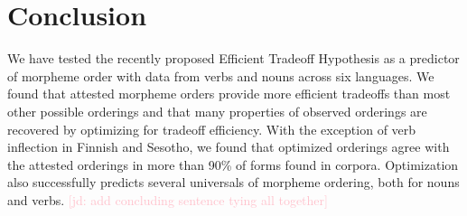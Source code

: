 \documentclass[11pt,letterpaper]{article}
\newcommand{\jd}[1]{\textcolor{Pink}{[jd: #1]}}
\begin{document}
\section{Conclusion}

We have tested the recently proposed Efficient Tradeoff Hypothesis as a predictor of morpheme order with data from verbs and nouns across six languages.
We found that attested morpheme orders provide more efficient tradeoffs than most other possible orderings and that many properties of observed orderings are recovered by optimizing for tradeoff efficiency.
With the exception of verb inflection in Finnish and Sesotho, we found that optimized orderings agree with the attested orderings in more than 90\% of forms found in corpora.
Optimization also successfully predicts several universals of morpheme ordering, both for nouns and verbs. \jd{add concluding sentence tying all together}


\printbibliography
\end{document}

